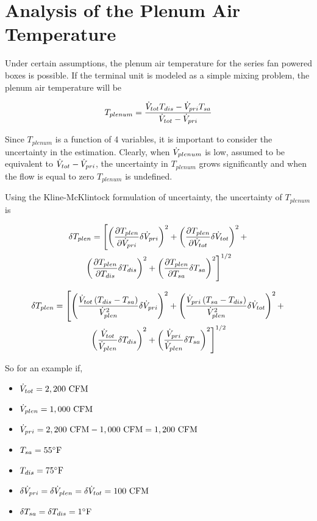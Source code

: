 \section{Analysis of the Plenum Air Temperature}

Under certain assumptions, the plenum air temperature for the series fan powered boxes is possible. If the terminal unit is modeled as a simple mixing problem, the plenum air temperature will be 

\begin{equation}
    T_{plenum}=\frac{\dot{V}_{tot}T_{dis}-\dot{V}_{pri}T_{sa}}{\dot{V}_{tot} -\dot{V}_{pri}}
\end{equation}

Since \(T_{plenum}\) is a function of 4 variables, it is important to consider the uncertainty in the estimation. Clearly, when \(\dot{V}_{plenum}\) is low, assumed to be equivalent to \(\dot{V}_{tot} - \dot{V}_{pri}\), the uncertainty in  \(T_{plenum}\) grows significantly and when the flow is equal to zero \(T_{plenum}\) is undefined. 

Using the Kline-McKlintock formulation of uncertainty, the uncertainty of \(T_{plenum}\) is 

\begin{multline}
    \delta T_{plen} = \left[\left( \pdv{T_{plen}}{\dot{V}_{pri}} \delta \dot{V}_{pri}   \right)^2  +\left( \pdv{T_{plen}}{\dot{V}_{tot}} \delta \dot{V}_{tot}   \right)^2 + \right. \\
    \left. \left( \pdv{T_{plen}}{T_{dis}} \delta T_{dis}   \right)^2 + \left( \pdv{T_{plen}}{T_{sa}} \delta T_{sa}   \right)^2  \right]^{1/2}
\end{multline}

\begin{multline}\label{eq:plenumUncertainty}
    \delta T_{plen} = \left[\left(  \frac{\dot{V}_{tot}\left(T_{dis}-T_{sa} \right)}{{\dot{V}_{plen}}^2}   \delta \dot{V}_{pri} \right)^2  +\left(\frac{\dot{V}_{pri}\left(T_{sa}-T_{dis} \right)}{{\dot{V}_{plen}}^2}      \delta \dot{V}_{tot}   \right)^2 + \right. \\
    \left. \left( \frac{\dot{V}_{tot}}{\dot{V}_{plen}} \delta T_{dis}   \right)^2 + \left(\frac{\dot{V}_{pri}}{\dot{V}_{plen}}  \delta T_{sa}   \right)^2  \right]^{1/2}
\end{multline}

So for an example if, 

\newcommand{\flowtotvalue}{2,200\text{ CFM}}
\newcommand{\plenflowvalue}{1,000\text{ CFM}}

\begin{itemize}
    \item \(\totflow{}=\flowtotvalue\)
    \item \(\plenflow{}=\plenflowvalue\)
    \item \(\priflow=\flowtotvalue - \plenflowvalue = 1,200\text{ CFM} \)
    \item \(T_{sa} = 55^{\circ}\text{F} \)
    \item \(T_{dis} = 75^{\circ}\text{F} \)
    \item \(\delta\dot{V}_{pri}{}=\delta\dot{V}_{plen}=\delta\dot{V}_{tot}=100 \text{ CFM}\)
    \item \(\delta T_{sa} = \delta T_{dis} = 1^{\circ} \text{F} \)
\end{itemize}

